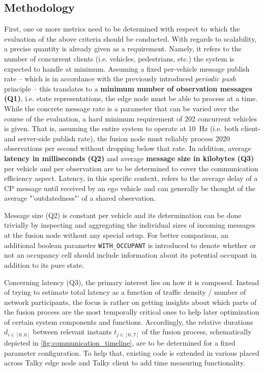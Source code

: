 \subsection{Methodology}
\label{subsec:evaluation:performance_evaluation:methodology}
First, one or more metrics need to be determined with respect to which the evaluation of the above criteria should be conducted. With regards to scalability, a precise quantity is already given as a requirement. Namely, it refers to the number of concurrent clients (i.e. vehicles, pedestrians, etc.) the system is expected to handle at minimum. Assuming a fixed per-vehicle message publish rate – which is in accordance with the previously introduced \textit{periodic push} principle – this translates to a \textbf{minimum number of observation messages (Q1)}, i.e. state representations, the edge node must be able to process at a time. While the concrete message rate is a parameter that can be varied over the course of the evaluation, a hard minimum requirement of 202 concurrent vehicles is given. That is, assuming the entire system to operate at \SI{10}{Hz} (i.e. both client- and server-side publish rate), the fusion node must reliably process 2020 observations per second without dropping below that rate. In addition, average \textbf{latency in milliseconds (Q2)} and average \textbf{message size in kilobytes (Q3)} per vehicle and per observation are to be determined to cover the communication efficiency aspect. Latency, in this specific context, refers to the average delay of a CP message until received by an ego vehicle and can generally be thought of the average "'outdatedness"' of a shared observation.
\par
\bigskip

Message size (Q2) is constant per vehicle and its determination can be done trivially by inspecting and aggregating the individual sizes of incoming messages at the fusion node without any special setup. For better comparison, an additional boolean parameter \texttt{WITH\_OCCUPANT} is introduced to denote whether or not an occupancy cell should include information about its potential occupant in addition to its pure state.
\par
\bigskip

Concerning latency (Q3), the primary interest lies on how it is composed. Instead of trying to estimate total latency as a function of traffic density / number of network participants, the focus is rather on getting insights about which parts of the fusion process are the most temporally critical ones to help later optimization of certain system components and functions. Accordingly, the relative durations $d_{i \in [0..6]}$ between relevant instants $t_{j \in [0..7]}$ of the fusion process, schematically depicted in \cref{fig:communication_timeline}, are to be determined for a fixed parameter configuration. To help that, existing code is extended in various placed across Talky edge node and Talky client to add time measuring functionality.
\par
\bigskip

